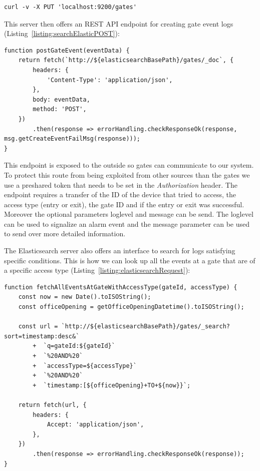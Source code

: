 \begin{lstlisting}[label={listing:elasticsearchGatesIndex},caption={cURL script for creating gates index}]
curl -v -X PUT 'localhost:9200/gates'
\end{lstlisting}

This server then offers an REST API endpoint for creating gate event logs (Listing~\ref{listing:searchElasticPOST}):
\begin{lstlisting}[label={listing:searchElasticPOST},caption={Interface of Elasticsearch server to create gate event logs}]
function postGateEvent(eventData) {
    return fetch(`http://${elasticsearchBasePath}/gates/_doc`, {
        headers: {
            'Content-Type': 'application/json',
        },
        body: eventData,
        method: 'POST',
    })
        .then(response => errorHandling.checkResponseOk(response, msg.getCreateEventFailMsg(response)));
}
\end{lstlisting}

This endpoint is exposed to the outside so gates can communicate to our system. To protect this route from being exploited from other sources than the gates we use a preshared token that needs to be set in the \emph{Authorization} header.
 The endpoint requires a transfer of the ID of the device that tried to access, the access type (entry or exit), the gate ID and if the entry or exit was successful. Moreover the optional parameters loglevel and message can be send. The loglevel can be used to signalize an alarm event and the message parameter can be used to send over more detailed information.

The Elasticsearch server also offers an interface to search for logs satisfying specific conditions. This is how we can look up all the events at a gate that are of a specific access type (Listing~\ref{listing:elasticsearchRequest}):

\begin{lstlisting}[label={listing:elasticsearchRequest},caption={Example search request to Elasticsearch server}]
function fetchAllEventsAtGateWithAccessType(gateId, accessType) {
    const now = new Date().toISOString();
    const officeOpening = getOfficeOpeningDatetime().toISOString();

    const url = `http://${elasticsearchBasePath}/gates/_search?sort=timestamp:desc&`
        +  `q=gateId:${gateId}`
        +  `%20AND%20`
        +  `accessType=${accessType}`
        +  `%20AND%20`
        +  `timestamp:[${officeOpening}+TO+${now}}`;
        
    return fetch(url, {
        headers: {
            Accept: 'application/json',
        },
    })
        .then(response => errorHandling.checkResponseOk(response));
}
\end{lstlisting}

